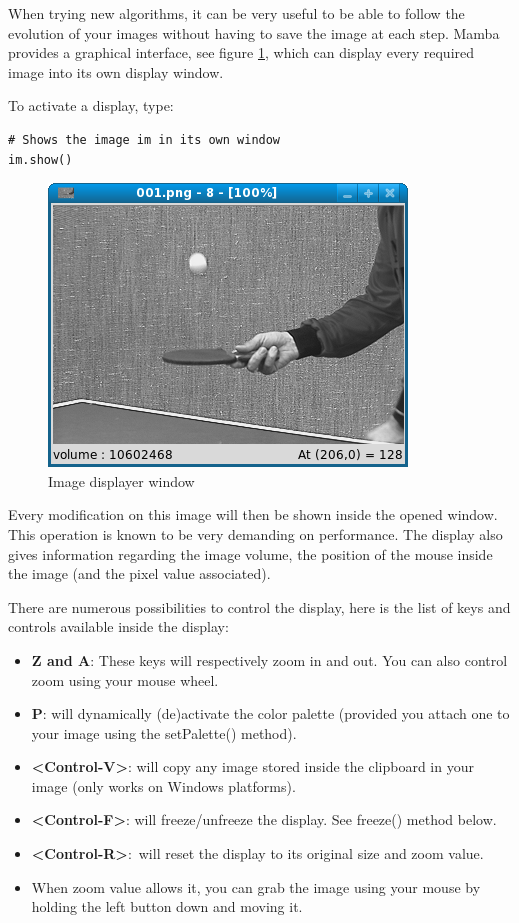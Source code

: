 \documentclass[a4paper,10pt,oneside]{article}
\begin{document}
When trying new algorithms, it can be very useful to be able to follow the 
evolution of your images without having to save the image at each step. Mamba
provides a graphical interface, see figure \ref{fig:win}, which can display 
every required image into its own display window.

To activate a display, type:

\lstset{language=Python}
\begin{lstlisting}
# Shows the image im in its own window
im.show()
\end{lstlisting}

\begin{figure}
\centering
\includegraphics[scale=0.5]{images/mamba_win.png}
\caption{Image displayer window}
\label{fig:win}
\end{figure}

Every modification on this image will then be shown inside the opened window.
This operation is known to be very demanding on performance. The display also
gives information regarding the image volume, the position of the mouse inside
the image (and the pixel value associated).

There are numerous possibilities to control the display, here is the list of
keys and controls available inside the display:

\begin{itemize}
\item \textbf{Z and A}: These keys will respectively zoom in and out. You can
also control zoom using your mouse wheel.
\item \textbf{P}: will dynamically (de)activate the color palette (provided you
attach one to your image using the setPalette() method).
\item \textbf{<Control-V>}: will copy any image stored inside the clipboard 
in your image (only works on Windows platforms).
\item \textbf{<Control-F>}: will freeze/unfreeze the display. See freeze() 
method below.
\item \textbf{<Control-R>}: will reset the display to its original size and 
zoom value.
\item When zoom value allows it, you can grab the image using your mouse by
holding the left button down and moving it.
\end{itemize}
\end{document}
